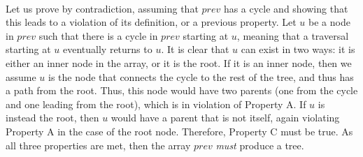 \documentclass{article}
\begin{document}
\begin{enumerate}
\\ Let us prove by contradiction, assuming that $prev$ has a cycle and showing that this leads to a violation of its definition, or a previous property. Let $u$ be a node in $prev$ such that there is a cycle in $prev$ starting at $u$, meaning that a traversal starting at $u$ eventually returns to $u$. It is clear that $u$ can exist in two ways: it is either an inner node in the array, or it is the root. If it is an inner node, then we assume $u$ is the node that connects the cycle to the rest of the tree, and thus has a path from the root. Thus, this node would have two parents (one from the cycle and one leading from the root), which is in violation of Property A. If $u$ is instead the root, then $u$ would have a parent that is not itself, again violating Property A in the case of the root node. Therefore, Property C must be true. As all three properties are met, then the array $prev$ \emph{must} produce a tree.
\end{enumerate}
\end{document}
